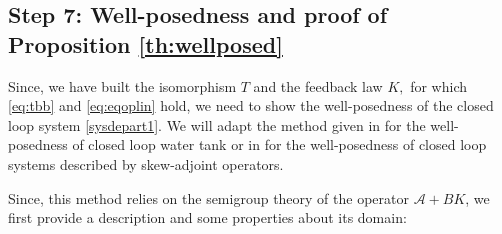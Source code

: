 \documentclass[11pt, dvipsnames]{amsart}
\begin{document}
\subsection{Step 7: Well-posedness and proof of Proposition \ref{th:wellposed}}
\label{sec:wellposed}
Since, we have built the isomorphism $T$ and the feedback law $K,$ for which \eqref{eq:tbb} and \eqref{eq:eqoplin}  hold, we need to show the well-posedness of the closed loop system \eqref{sysdepart1}. We will adapt the method given in \cite{Coron2022-stabilization} for the well-posedness of closed loop water tank or in \cite{Gagnon2022-fredholm} for the well-posedness of closed loop systems described by skew-adjoint operators. 

Since, this method relies on the semigroup theory of the operator $\mathcal{A}+BK$, we first provide a description and some properties about its domain:
\end{document}
